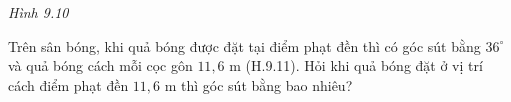 \begin{exercises}
\begin{questions}[series=SGK]
\begin{center}
        \textit{Hình 9.10}
        \end{center}

        \answerline
        \answerline
        \answerline

        \item Trên sân bóng, khi quả bóng được đặt tại điểm phạt đền thì có góc sút bằng $36^\circ$ và quả bóng cách mỗi cọc gôn $11{,}6$ m (H.9.11). Hỏi khi quả bóng đặt ở vị trí cách điểm phạt đền $11{,}6$ m thì góc sút bằng bao nhiêu?


        \answerline
        \answerline
    \end{questions}
\end{exercises}

